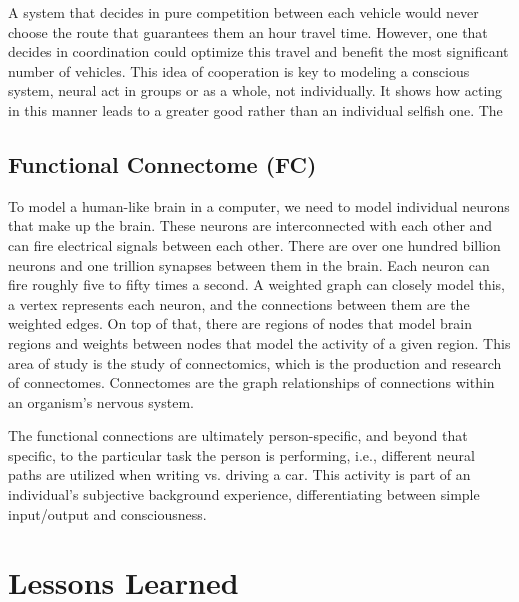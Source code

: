 \documentclass[journal,onecolumn]{IEEEtran}
\begin{document}
A system that decides in pure competition between each vehicle would never choose the route that guarantees them an hour travel time. However, one that decides in coordination could optimize this travel and benefit the most significant number of vehicles. This idea of cooperation is key to modeling a conscious system, neural act in groups or as a whole, not individually. It shows how acting in this manner leads to a greater good rather than an individual selfish one. The  

\subsection{Functional Connectome (FC)}

To model a human-like brain in a computer, we need to model individual neurons that make up the brain. These neurons are interconnected with each other and can fire electrical signals between each other. There are over one hundred billion neurons and one trillion synapses between them in the brain. Each neuron can fire roughly five to fifty times a second. A weighted graph can closely model this, a vertex represents each neuron, and the connections between them are the weighted edges.
On top of that, there are regions of nodes that model brain regions and weights between nodes that model the activity of a given region. This area of study is the study of connectomics, which is the production and research of connectomes. Connectomes are the graph relationships of connections within an organism's nervous system.

The functional connections are ultimately person-specific, and beyond that specific, to the particular task the person is performing, i.e., different neural paths are utilized when writing vs. driving a car. This activity is part of an individual's subjective background experience, differentiating between simple input/output and consciousness.

\section{Lessons Learned}
\end{document}
